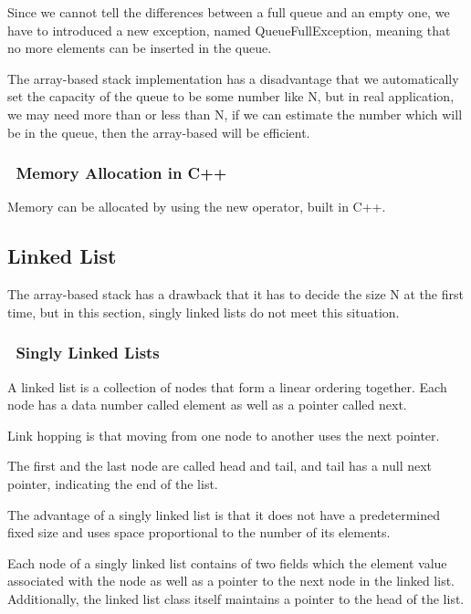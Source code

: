 \documentclass[twocolumn,10pt]{jarticle}
\begin{document}
Since we cannot tell the differences between a full queue and an empty one, we have to introduced a new exception, named QueueFullException, meaning that no more elements can be inserted in the queue.

The array-based stack implementation has a disadvantage that we automatically set the capacity of the queue to be some number like N, but in real application, we may need more than or less than N, if we can estimate the number which will be in the queue, then the array-based will be efficient.
\subsubsection{\ Memory Allocation in C++}
Memory can be allocated by using the new operator, built in C++.
\setcounter{section}{4}
\setcounter{subsection}{3}
\subsection{ Linked List}
The array-based stack has a drawback that it has to decide the size N at the first time, but in this section, singly linked lists do not meet this situation.  
\subsubsection{\ Singly Linked Lists}
A linked list is a collection of nodes that form a linear ordering together. Each node has a data number called element as well as a pointer called next. 

Link hopping is that moving from one node to another uses the next pointer.

The first and the last node are called head and tail, and tail has a null next pointer, indicating the end of the list.

The advantage of a singly linked list is that it does not have a predetermined fixed size and uses space proportional to the number of its elements.

Each node of a singly linked list contains of two fields which the element value associated with the node as well as a pointer to the next node in the linked list. Additionally, the linked list class itself maintains a pointer to the head of the list.
\end{document}
